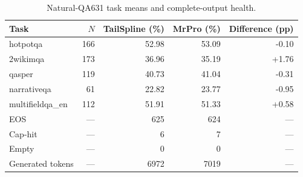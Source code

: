 \begin{table}[ht]
\centering\small
\caption{Natural-QA631 task means and complete-output health.}
\label{tab:tailspline-natural-tasks}
\begin{tabular}{@{}lrrrr@{}}
\toprule
Task & $N$ & TailSpline (\%) & MrPro (\%) & Difference (pp) \\
\midrule
hotpotqa & 166 & 52.98 & 53.09 & -0.10 \\
2wikimqa & 173 & 36.96 & 35.19 & +1.76 \\
qasper & 119 & 40.73 & 41.04 & -0.31 \\
narrativeqa & 61 & 22.82 & 23.77 & -0.95 \\
multifieldqa\_en & 112 & 51.91 & 51.33 & +0.58 \\
\midrule
EOS & --- & 625 & 624 & --- \\
Cap-hit & --- & 6 & 7 & --- \\
Empty & --- & 0 & 0 & --- \\
Generated tokens & --- & 6972 & 7019 & --- \\
\bottomrule
\end{tabular}
\end{table}
